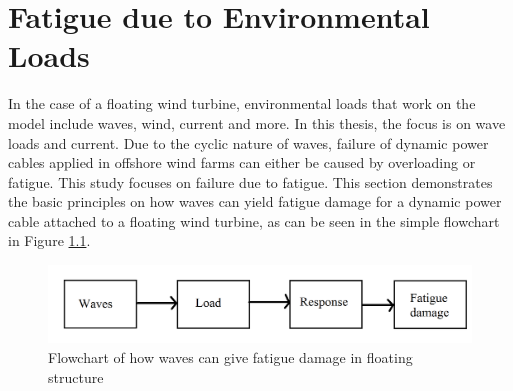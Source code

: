 \chapter{Fatigue due to Environmental Loads}
\label{chap:fatigue}
In the case of a floating wind turbine, environmental loads that work on the model include waves, wind, current and more. In this thesis, the focus is on wave loads and current. Due to the cyclic nature of waves, failure of dynamic power cables applied in offshore wind farms can either be caused by overloading or fatigue.  This study focuses on failure due to fatigue. This section demonstrates the basic principles on how waves can yield fatigue damage for a dynamic power cable attached to a floating wind turbine, as can be seen in the simple flowchart in Figure \ref{fig:flowchart}. 

\begin{figure}[h!]
\centering
\includegraphics[scale=0.75]{figures/box}
\caption[$\; \:$Flowchart of how waves can give fatigue damage in floating structure]{Flowchart of how waves can give fatigue damage in floating structure}
 \label{fig:flowchart}
\end{figure}

